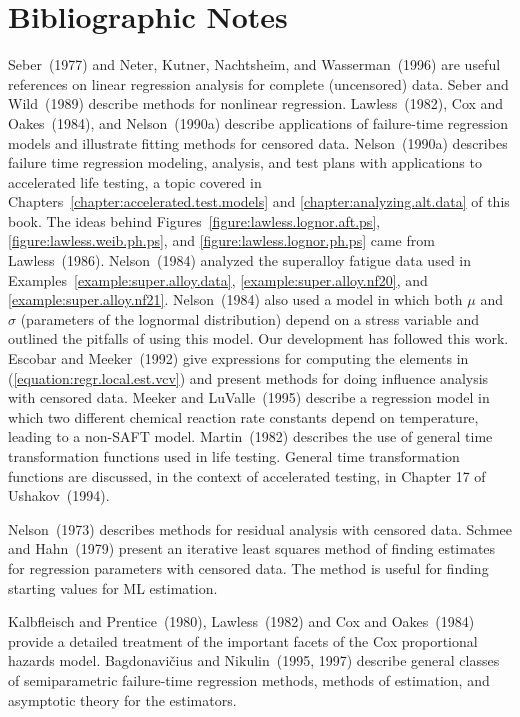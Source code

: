 
\section*{Bibliographic Notes}
Seber~(1977) and Neter, Kutner, Nachtsheim, and Wasserman~(1996) are
useful references on linear regression analysis for complete
(uncensored) data. Seber and Wild~(1989) describe methods for
nonlinear regression.  Lawless~(1982), Cox and Oakes~(1984), and
Nelson~(1990a) describe applications of failure-time regression
models and illustrate fitting methods for censored
data. Nelson~(1990a) describes failure time regression modeling,
analysis, and test plans with applications to accelerated life
testing, a topic covered in
Chapters~\ref{chapter:accelerated.test.models} and
\ref{chapter:analyzing.alt.data} of this book. The ideas
behind Figures~\ref{figure:lawless.lognor.aft.ps},
\ref{figure:lawless.weib.ph.ps}, and 
\ref{figure:lawless.lognor.ph.ps} came from Lawless~(1986).
Nelson~(1984) analyzed the superalloy fatigue data used in
Examples~\ref{example:super.alloy.data},
\ref{example:super.alloy.nf20},
and \ref{example:super.alloy.nf21}.  Nelson~(1984) also used a model
in which both $\mu$ and $\sigma$ (parameters of the lognormal
distribution) depend on a stress variable and outlined the pitfalls
of using this model.  Our development has followed this
work. Escobar and Meeker~(1992) give expressions for computing the
elements in (\ref{equation:regr.local.est.vcv}) and present methods
for doing influence analysis with censored data. Meeker and
LuValle~(1995) describe a regression model in which two different
chemical reaction rate constants depend on temperature, leading to a
non-SAFT model.  Martin~(1982) describes the use of general time
transformation functions used in life testing.  General time
transformation functions are discussed, in the context of
accelerated testing, in Chapter 17 of Ushakov~(1994).

Nelson~(1973) describes methods for residual analysis with censored
data.  Schmee and Hahn~(1979) present an iterative least squares
method of finding estimates for regression parameters with censored
data. The method is useful for finding starting values for ML
estimation. 

Kalbfleisch and Prentice~(1980), Lawless~(1982) and Cox and
Oakes~(1984) provide a detailed treatment of the important facets of
the Cox proportional hazards model.  Bagdonavi\v{c}ius and
Nikulin~(1995, 1997) describe general classes of semiparametric
failure-time regression methods, methods of estimation, and
asymptotic theory for the estimators.

